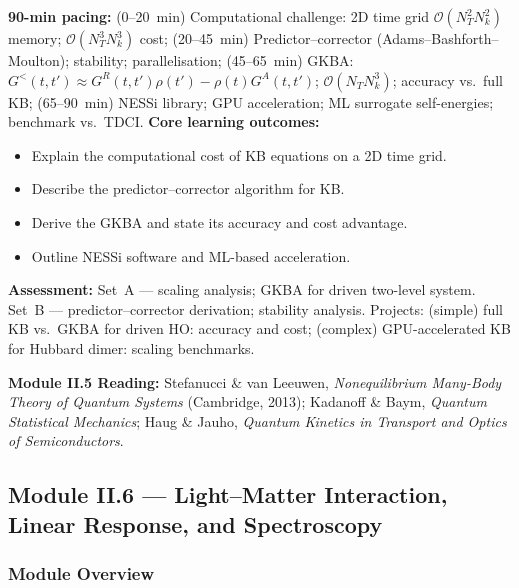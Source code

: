 \documentclass[11pt,a4paper]{article}
\begin{document}
\medskip

\begin{tcolorbox}[modulebox, title={Module~II.5 / L12: Numerical Methods for NEGF}]
\textbf{90-min pacing:} (0--20~min) Computational challenge: 2D time grid $\mathcal{O}(N_T^2N_k^2)$ memory; $\mathcal{O}(N_T^3N_k^3)$ cost; (20--45~min) Predictor--corrector (Adams--Bashforth--Moulton); stability; parallelisation; (45--65~min) GKBA: $G^<(t,t')\approx G^R(t,t')\rho(t')-\rho(t)G^A(t,t')$; $\mathcal{O}(N_TN_k^3)$; accuracy vs.\ full KB; (65--90~min) NESSi library; GPU acceleration; ML surrogate self-energies; benchmark vs.\ TDCI.
\medskip\textbf{Core learning outcomes:}
\begin{itemize}[leftmargin=1.4em,topsep=2pt,itemsep=1pt]
  \item Explain the computational cost of KB equations on a 2D time grid.
  \item Describe the predictor--corrector algorithm for KB.
  \item Derive the GKBA and state its accuracy and cost advantage.
  \item Outline NESSi software and ML-based acceleration.
\end{itemize}
\medskip\textbf{Assessment:}
Set~A --- scaling analysis; GKBA for driven two-level system.
Set~B --- predictor--corrector derivation; stability analysis.
Projects: (simple) full KB vs.\ GKBA for driven HO: accuracy and cost; (complex) GPU-accelerated KB for Hubbard dimer: scaling benchmarks.
\end{tcolorbox}

\begin{tcolorbox}[highlightbox]
\textbf{Module II.5 Reading:} Stefanucci \& van Leeuwen, \textit{Nonequilibrium Many-Body Theory of Quantum Systems} (Cambridge, 2013); Kadanoff \& Baym, \textit{Quantum Statistical Mechanics}; Haug \& Jauho, \textit{Quantum Kinetics in Transport and Optics of Semiconductors}.
\end{tcolorbox}

\subsection{Module II.6 --- Light--Matter Interaction, Linear Response, and Spectroscopy}
\label{sec:mod-II6}

\subsubsection*{Module Overview}
\end{document}
